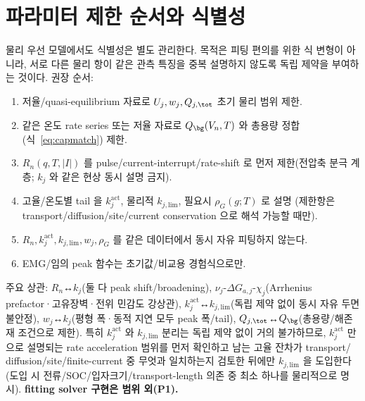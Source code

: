 \section{파라미터 제한 순서와 식별성}\label{sec:ident}
물리 우선 모델에서도 식별성은 별도 관리한다. 목적은 피팅 편의를 위한 식 변형이 아니라, 서로 다른 물리
항이 같은 관측 특징을 중복 설명하지 않도록 독립 제약을 부여하는 것이다. 권장 순서:
\begin{enumerate}[label=\arabic*),leftmargin=2.0em]
\item 저율/quasi-equilibrium 자료로 $U_j,w_j,Q_{j,\tot}$ 초기 물리 범위 제한.
\item 같은 온도 rate series 또는 저율 자료로 $Q_\bg(V_n,T)$ 와 총용량 정합(식~\eqref{eq:capmatch}) 제한.
\item $R_n(q,T,|I|)$ 를 pulse/current-interrupt/rate-shift 로 먼저 제한(전압축 분극 계층; $k_j$ 와 같은
  현상 동시 설명 금지).
\item 고율/온도별 tail 을 $k_j^\mathrm{act}$, 물리적 $k_{j,\mathrm{lim}}$, 필요시 $\rho_G(g;T)$ 로 설명
  (제한항은 transport/diffusion/site/current conservation 으로 해석 가능할 때만).
\item $R_n,k_j^\mathrm{act},k_{j,\mathrm{lim}},w_j,\rho_G$ 를 같은 데이터에서 동시 자유 피팅하지 않는다.
\item EMG/임의 peak 함수는 초기값/비교용 경험식으로만.
\end{enumerate}
주요 상관: $R_n$↔$k_j$(둘 다 peak shift/broadening), $\nu_j$-$\Delta G_{a,j}$-$\chi_j$(Arrhenius
prefactor·고유장벽·전위 민감도 강상관), $k_j^\mathrm{act}$↔$k_{j,\mathrm{lim}}$(독립 제약 없이 동시
자유 두면 불안정), $w_j$↔$k_j$(평형 폭·동적 지연 모두 peak 폭/tail), $Q_{j,\tot}$↔$Q_\bg$(총용량/해존재
조건으로 제한). 특히 $k_j^\mathrm{act}$ 와 $k_{j,\mathrm{lim}}$ 분리는 독립 제약 없이 거의 불가하므로,
$k_j^\mathrm{act}$ 만으로 설명되는 rate acceleration 범위를 먼저 확인하고 남는 고율 잔차가 transport/
diffusion/site/finite-current 중 무엇과 일치하는지 검토한 뒤에만 $k_{j,\mathrm{lim}}$ 을 도입한다(도입 시
전류/SOC/입자크기/transport-length 의존 중 최소 하나를 물리적으로 명시). \textbf{fitting solver 구현은
범위 외(P1).}

